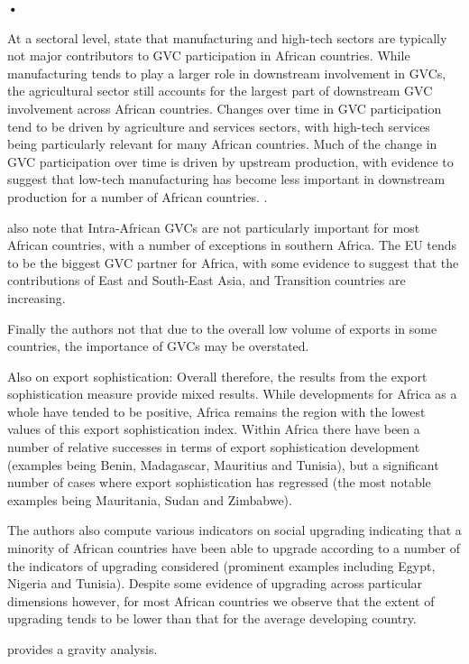 \textbf{\textbf{•}}\documentclass[a4paper]{article}
\begin{document}
At a sectoral level, \citet{foster2015global} state that manufacturing and high-tech sectors are typically not major contributors to GVC participation in African countries. While manufacturing tends to play a larger role in downstream involvement in GVCs, the agricultural sector still accounts for the largest part of downstream GVC involvement across African countries. Changes over time in GVC participation tend to be driven by agriculture and services sectors, with high-tech services being particularly relevant for many African countries. Much of the change in GVC participation over time is driven by upstream production, with evidence to suggest that low-tech manufacturing has become less important in downstream production for a number of African countries. .

\citet{foster2015global} also note that Intra-African GVCs are not particularly important for most African countries, with a number of exceptions in southern Africa. The EU tends to be the biggest GVC partner for Africa, with some evidence to suggest that the contributions of East and South-East Asia, and Transition countries are increasing.

Finally the authors not that due to the overall low volume of exports in some countries, the importance  of GVCs may be overstated. 

Also on export sophistication: 
Overall therefore, the results from the export sophistication measure provide mixed results. While developments for Africa as a whole have tended to be positive, Africa remains the region with the lowest values of this export sophistication index. Within Africa there have been a number of relative successes in terms of export sophistication development (examples being Benin, Madagascar, Mauritius and Tunisia), but a significant number of cases where export sophistication has regressed (the most notable
examples being Mauritania, Sudan and
Zimbabwe).

The authors also compute various indicators on social upgrading indicating that a minority of African countries have been able to upgrade according to a number of the indicators of upgrading considered (prominent examples including Egypt, Nigeria and Tunisia). Despite some evidence of upgrading across particular dimensions however, for most African countries we observe that the extent of upgrading tends to be lower than that for the average developing country.


\citet{kwizera2019factors} provides a gravity analysis. 
\end{document}
